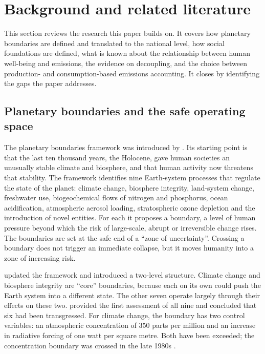 \section{Background and related literature}\label{sec:literature}

This section reviews the research this paper builds on. It covers how planetary boundaries are defined and translated to the national level, how social foundations are defined, what is known about the relationship between human well-being and emissions, the evidence on decoupling, and the choice between production- and consumption-based emissions accounting. It closes by identifying the gaps the paper addresses.

\subsection{Planetary boundaries and the safe operating space}

The planetary boundaries framework was introduced by \citet{rockstrom2009}. Its starting point is that the last ten thousand years, the Holocene, gave human societies an unusually stable climate and biosphere, and that human activity now threatens that stability. The framework identifies nine Earth-system processes that regulate the state of the planet: climate change, biosphere integrity, land-system change, freshwater use, biogeochemical flows of nitrogen and phosphorus, ocean acidification, atmospheric aerosol loading, stratospheric ozone depletion and the introduction of novel entities. For each it proposes a boundary, a level of human pressure beyond which the risk of large-scale, abrupt or irreversible change rises. The boundaries are set at the safe end of a ``zone of uncertainty''. Crossing a boundary does not trigger an immediate collapse, but it moves humanity into a zone of increasing risk.

\citet{steffen2015} updated the framework and introduced a two-level structure. Climate change and biosphere integrity are ``core'' boundaries, because each on its own could push the Earth system into a different state. The other seven operate largely through their effects on these two. \citet{richardson2023} provided the first assessment of all nine and concluded that six had been transgressed. For climate change, the boundary has two control variables: an atmospheric \COtwo{} concentration of 350 parts per million and an increase in radiative forcing of one watt per square metre. Both have been exceeded; the concentration boundary was crossed in the late 1980s \citep{fanning2022}.

